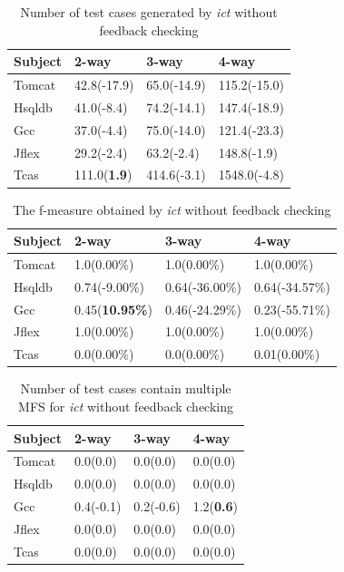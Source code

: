 \documentclass[10pt,journal,compsoc]{IEEEtran}
\begin{document}
{\begin{table}[ht]
\caption{Number of test cases generated by \emph{ict} without feedback checking}
\label{tests-ict-nonfb}
\centering
    \begin{tabular}{|l|l|l|l|}
    \hline
 Subject      & 2-way                     & 3-way                     & 4-way                       \\ \hline
Tomcat	&42.8(-17.9)	&65.0(-14.9)	&115.2(-15.0)	\\
Hsqldb	&41.0(-8.4)	&74.2(-14.1)	&147.4(-18.9)	\\
Gcc	&37.0(-4.4)	&75.0(-14.0)	&121.4(-23.3)	\\
Jflex	&29.2(-2.4)	&63.2(-2.4)	&148.8(-1.9)	\\
Tcas	&111.0(\textbf{1.9})	&414.6(-3.1)	&1548.0(-4.8)	\\\hline
    \end{tabular}
\end{table}

\begin{table}[ht]
\caption{The f-measure obtained by \emph{ict} without feedback checking}
\label{fm-ict-nonfb}
\centering
    \begin{tabular}{|l|l|l|l|}
    \hline
 Subject      & 2-way                     & 3-way                     & 4-way                       \\ \hline
Tomcat	&1.0(0.00\%)	&1.0(0.00\%)	&1.0(0.00\%)	\\
Hsqldb	&0.74(-9.00\%)	&0.64(-36.00\%)	&0.64(-34.57\%)	\\
Gcc	&0.45(\textbf{10.95\%})	&0.46(-24.29\%)	&0.23(-55.71\%)	\\
Jflex	&1.0(0.00\%)	&1.0(0.00\%)	&1.0(0.00\%)	\\
Tcas	&0.0(0.00\%)	&0.0(0.00\%)	&0.01(0.00\%)	\\\hline
    \end{tabular}
\end{table}

\begin{table}[ht]
\caption{Number of test cases contain multiple MFS for \emph{ict} without feedback checking}
\label{multi-ict-nonfb}
\centering
    \begin{tabular}{|l|l|l|l|}
    \hline
 Subject      & 2-way                     & 3-way                     & 4-way                       \\ \hline
Tomcat	&0.0(0.0)	&0.0(0.0)	&0.0(0.0)	\\
Hsqldb	&0.0(0.0)	&0.0(0.0)	&0.0(0.0)	\\
Gcc	&0.4(-0.1)	&0.2(-0.6)	&1.2(\textbf{0.6})	\\
Jflex	&0.0(0.0)	&0.0(0.0)	&0.0(0.0)	\\
Tcas	&0.0(0.0)	&0.0(0.0)	&0.0(0.0)	\\\hline
    \end{tabular}
\end{table}

}
\end{document}
